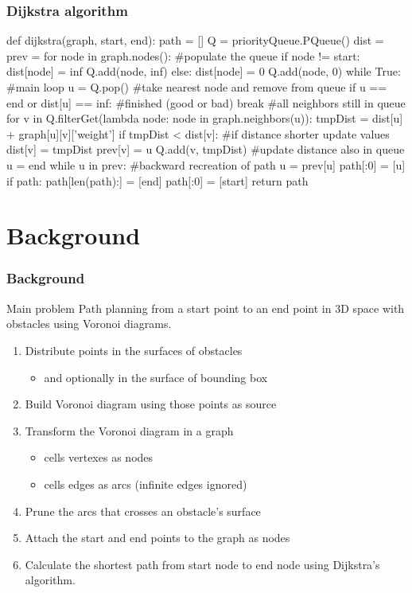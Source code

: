 \begin{frame}[fragile]
  \frametitle{Dijkstra algorithm}
  \begin{pblock}
def dijkstra(graph, start, end):
  path = []
  Q = priorityQueue.PQueue()
  dist = {}
  prev = {}
  for node in graph.nodes(): #populate the queue
    if node != start:
      dist[node] = inf
      Q.add(node, inf)
    else:
      dist[node] = 0
      Q.add(node, 0)
  while True:  #main loop
    u = Q.pop() #take nearest node and remove from queue
    if u == end or dist[u] == inf: #finished (good or bad)
      break
    #all neighbors still in queue
    for v in Q.filterGet(lambda node: node in graph.neighbors(u)):
      tmpDist = dist[u] + graph[u][v]['weight']
      if tmpDist < dist[v]: #if distance shorter update values
        dist[v] = tmpDist
        prev[v] = u
        Q.add(v, tmpDist) #update distance also in queue
  u = end
  while u in prev:  #backward recreation of path
      u = prev[u]
      path[:0] = [u]
  if path:
      path[len(path):] = [end]
      path[:0] = [start]
  return path
  \end{pblock}  
\end{frame}

\section{Background}

\begin{frame}
  \frametitle{Background}
  \begin{block}{Main problem}
    \alert{Path planning} from a \alert{start} point to an \alert{end}
    point in 3D space with obstacles using \alert{Voronoi} diagrams.
  \end{block}\pause
  \begin{enumerate}
  \item Distribute \alert{points} in the surfaces of obstacles
    \begin{itemize}
    \item and optionally in the surface of bounding box\pause
    \end{itemize}
  \item Build \alert{Voronoi} diagram using those points as
    source\pause
  \item Transform the Voronoi diagram in a \alert{graph}
    \begin{itemize}
    \item cells \alert{vertexes} as \alert{nodes}
    \item cells \alert{edges} as \alert{arcs} (infinite edges
      ignored)\pause
    \end{itemize}
  \item \alert{Prune} the arcs that crosses an obstacle's
    surface\pause
  \item Attach the \alert{start} and \alert{end} points to the
    graph as nodes\pause
  \item Calculate the shortest path from start node to end node using
    \alert{Dijkstra}'s algorithm.
  \end{enumerate}
\end{frame}

